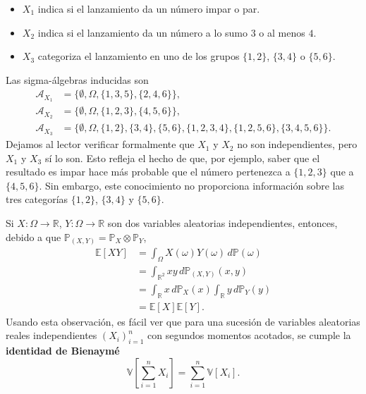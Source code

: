 \documentclass[11pt]{report}
\theoremstyle{definition}
\theoremstyle{plain}
\numberwithin{equation}{section}
\begin{document}
\begin{itemize}
    \item \(X_1\) indica si el lanzamiento da un número impar o par.
    \item \(X_2\) indica si el lanzamiento da un número a lo sumo \(3\) o al menos \(4\).
    \item \(X_3\) categoriza el lanzamiento en uno de los grupos \(\{1,2\}\), \(\{3,4\}\) o \(\{5,6\}\).
\end{itemize}

Las sigma-álgebras inducidas son
\begin{align*}
    \mathcal{A}_{X_1}
    &=
    \{\emptyset,\Omega,\{1,3,5\},\{2,4,6\}\},\\
    \mathcal{A}_{X_2}
    &=
    \{\emptyset,\Omega,\{1,2,3\},\{4,5,6\}\},\\
    \mathcal{A}_{X_3}
    &=
    \{\emptyset,\Omega,\{1,2\},\{3,4\},\{5,6\},
    \{1,2,3,4\},\{1,2,5,6\},\{3,4,5,6\}\}.
\end{align*}
Dejamos al lector verificar formalmente que \(X_1\) y \(X_2\) no son independientes, pero \(X_1\) y \(X_3\) sí lo son. Esto refleja el hecho de que, por ejemplo, saber que el resultado es impar hace más probable que el número pertenezca a \(\{1,2,3\}\) que a \(\{4,5,6\}\). Sin embargo, este conocimiento no proporciona información sobre las tres categorías \(\{1,2\}\), \(\{3,4\}\) y \(\{5,6\}\).

Si \(X:\Omega\to\mathbb{R}\), \(Y:\Omega\to\mathbb{R}\) son dos variables aleatorias independientes, entonces, debido a que \(\mathbb{P}_{(X,Y)}=\mathbb{P}_X\otimes\mathbb{P}_Y\),
\begin{align*}
    \mathbb{E}[XY]
    &=
    \int_\Omega X(\omega)Y(\omega)\,d\mathbb{P}(\omega)\\
    &=
    \int_{\mathbb{R}^2} xy\,d\mathbb{P}_{(X,Y)}(x,y)\\
    &=
    \int_{\mathbb{R}}x\,d\mathbb{P}_X(x)
    \int_{\mathbb{R}}y\,d\mathbb{P}_Y(y)\\
    &=
    \mathbb{E}[X]\mathbb{E}[Y].
\end{align*}
Usando esta observación, es fácil ver que para una sucesión de variables aleatorias reales independientes \((X_i)_{i=1}^n\) con segundos momentos acotados, se cumple la \textbf{identidad de Bienaymé}
\begin{equation*}
    \mathbb{V}\left[\sum_{i=1}^{n}X_i\right]
    =
    \sum_{i=1}^{n}\mathbb{V}[X_i].
    \tag{A.3.1}
\end{equation*}
\end{document}
